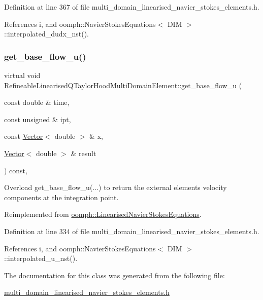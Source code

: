 Definition at line 367 of file multi\+\_\+domain\+\_\+linearised\+\_\+navier\+\_\+stokes\+\_\+elements.\+h.



References i, and oomph\+::\+Navier\+Stokes\+Equations$<$ D\+I\+M $>$\+::interpolated\+\_\+dudx\+\_\+nst().

\mbox{\label{classRefineableLinearisedQTaylorHoodMultiDomainElement_add3d103c76066426856143d9b683053d}} 
\subsubsection{\texorpdfstring{get\+\_\+base\+\_\+flow\+\_\+u()}{get\_base\_flow\_u()}}
{\footnotesize\ttfamily virtual void Refineable\+Linearised\+Q\+Taylor\+Hood\+Multi\+Domain\+Element\+::get\+\_\+base\+\_\+flow\+\_\+u (\begin{DoxyParamCaption}\item[{const double \&}]{time,  }\item[{const unsigned \&}]{ipt,  }\item[{const \hyperlink{classoomph_1_1Vector}{Vector}$<$ double $>$ \&}]{x,  }\item[{\hyperlink{classoomph_1_1Vector}{Vector}$<$ double $>$ \&}]{result }\end{DoxyParamCaption}) const\hspace{0.3cm}{\ttfamily [inline]}, {\ttfamily [virtual]}}



Overload get\+\_\+base\+\_\+flow\+\_\+u(...) to return the external element\textquotesingle{}s velocity components at the integration point. 



Reimplemented from \hyperlink{classoomph_1_1LinearisedNavierStokesEquations_a7c219a316dbe67ef01f8c5b666e0c9ae}{oomph\+::\+Linearised\+Navier\+Stokes\+Equations}.



Definition at line 334 of file multi\+\_\+domain\+\_\+linearised\+\_\+navier\+\_\+stokes\+\_\+elements.\+h.



References i, and oomph\+::\+Navier\+Stokes\+Equations$<$ D\+I\+M $>$\+::interpolated\+\_\+u\+\_\+nst().



The documentation for this class was generated from the following file\+:\begin{DoxyCompactItemize}
\item 
\hyperlink{multi__domain__linearised__navier__stokes__elements_8h}{multi\+\_\+domain\+\_\+linearised\+\_\+navier\+\_\+stokes\+\_\+elements.\+h}\end{DoxyCompactItemize}
